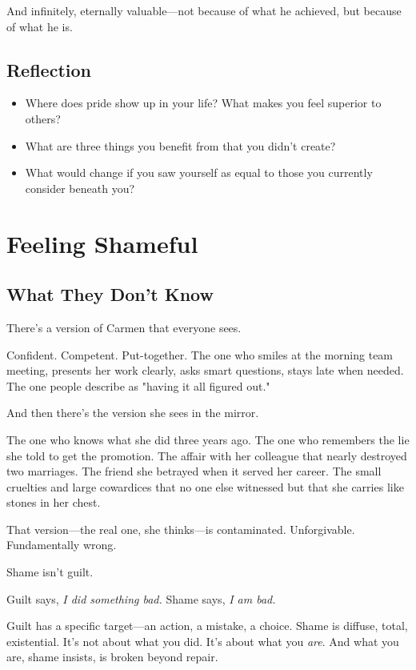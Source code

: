 \documentclass[11pt,twoside]{book}
\begin{document}
And infinitely, eternally valuable—not because of what he achieved, but because of what he is.

\section*{Reflection}

\begin{itemize}
\item Where does pride show up in your life? What makes you feel superior to others?
\item What are three things you benefit from that you didn't create?
\item What would change if you saw yourself as equal to those you currently consider beneath you?
\end{itemize}

\chapter{Feeling Shameful}

\section*{What They Don't Know}

There's a version of Carmen that everyone sees.

Confident. Competent. Put-together. The one who smiles at the morning team meeting, presents her work clearly, asks smart questions, stays late when needed. The one people describe as "having it all figured out."

And then there's the version she sees in the mirror.

The one who knows what she did three years ago. The one who remembers the lie she told to get the promotion. The affair with her colleague that nearly destroyed two marriages. The friend she betrayed when it served her career. The small cruelties and large cowardices that no one else witnessed but that she carries like stones in her chest.

That version—the real one, she thinks—is contaminated. Unforgivable. Fundamentally wrong.

Shame isn't guilt.

Guilt says, \emph{I did something bad.} Shame says, \emph{I am bad.}

Guilt has a specific target—an action, a mistake, a choice. Shame is diffuse, total, existential. It's not about what you did. It's about what you \emph{are}. And what you are, shame insists, is broken beyond repair.
\end{document}
